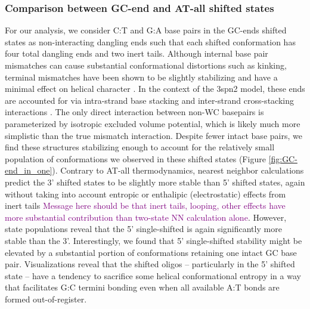 \documentclass[journal=jpcbfk,manuscript=article]{achemso}
\begin{document}
\subsubsection{\label{sec:Results}Comparison between GC-end and AT-all shifted states}

For our analysis, we consider C:T and G:A base pairs in the GC-ends shifted states as non-interacting dangling ends such that each shifted conformation has four total dangling ends and two inert tails. Although internal base pair mismatches can cause substantial conformational distortions such as kinking, terminal mismatches have been shown to be slightly stabilizing and have a minimal effect on helical character \citep{Santalucia2004TM, DiMichele2014EffectHybridization}. In the context of the 3spn2 model, these ends are accounted for via intra-strand base stacking and inter-strand cross-stacking interactions \citep{Hinckley2013AnHybridization}. The only direct interaction between non-WC basepairs is parameterized by isotropic excluded volume potential, which is likely much more simplistic than the true mismatch interaction. Despite fewer intact base pairs, we find these structures stabilizing enough to account for the relatively small population of conformations we observed in these shifted states (Figure \ref{fig:GC-end_in_one}). Contrary to AT-all thermodynamics, nearest neighbor calculations predict the 3' shifted states to be slightly more stable than 5' shifted states, again without taking into account entropic or enthalipic (electrostatic) effects from inert tails \textcolor{Purple}{Message here should be that inert tails, looping, other effects have more substantial contribution than two-state NN calculation alone}. However, state populations reveal that the 5' single-shifted is again significantly more stable than the 3'. Interestingly, we found that 5' single-shifted stability might be elevated by a substantial portion of conformations retaining one intact GC base pair. Visualizations reveal that the shifted oligos -- particularly in the 5' shifted state -- have a tendency to sacrifice some helical conformational entropy in a way that facilitates G:C termini bonding even when all available A:T bonds are formed out-of-register.
\end{document}
